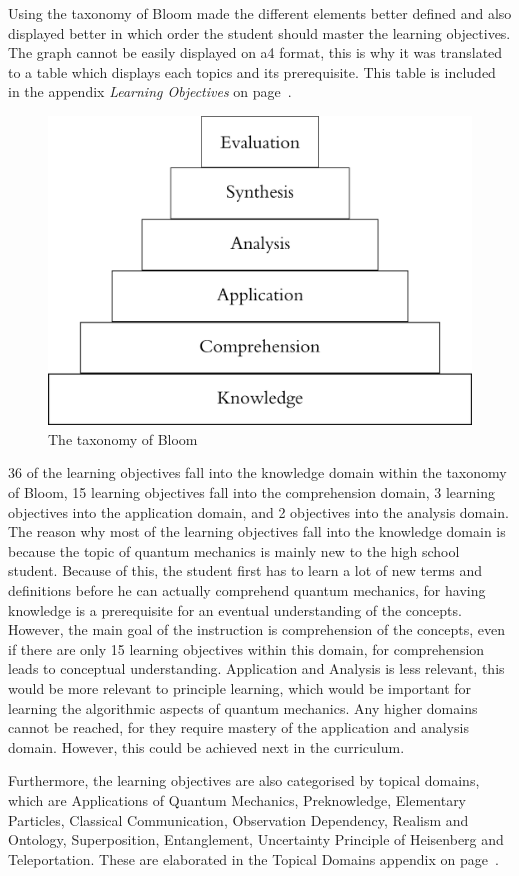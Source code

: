 \documentclass[11pt,twoside]{report} %
\begin{document}
Using the taxonomy of Bloom made the different elements better defined and also displayed better in which order the student should master the learning objectives. The graph cannot be easily displayed on a4 format, this is why it was translated to a table which displays each topics and its prerequisite. This table is included in the appendix \emph{Learning Objectives} on page~\pageref{app:learningobjectives}.

\begin{figure}[h]
\centering
\includegraphics[width=.4\textwidth]{bloom}
\caption{The taxonomy of Bloom \protect\cite{bloom}\label{fig:bloom}}
\end{figure}

36 of the learning objectives fall into the knowledge domain within the taxonomy of Bloom, 15 learning objectives fall into the comprehension domain, 3 learning objectives into the application domain, and 2 objectives into the analysis domain. The reason why most of the learning objectives fall into the knowledge domain is because the topic of quantum mechanics is mainly new to the high school student. Because of this, the student first has to learn a lot of new terms and definitions before he can actually comprehend quantum mechanics, for having knowledge is a prerequisite for an eventual understanding of the concepts. However, the main goal of the instruction is comprehension of the concepts, even if there are only 15 learning objectives within this domain, for comprehension leads to conceptual understanding. Application and Analysis is less relevant, this would be more relevant to principle learning, which would be important for learning the algorithmic aspects of quantum mechanics. Any higher domains cannot be reached, for they require mastery of the application and analysis domain. However, this could be achieved next in the curriculum.

Furthermore, the learning objectives are also categorised by topical domains, which are Applications of Quantum Mechanics, Preknowledge, Elementary Particles, Classical Communication, Observation Dependency, Realism and Ontology, Superposition, Entanglement, Uncertainty Principle of Heisenberg and Teleportation. These are elaborated in the Topical Domains appendix on page~\pageref{app:topicaldomains}.
\end{document}
